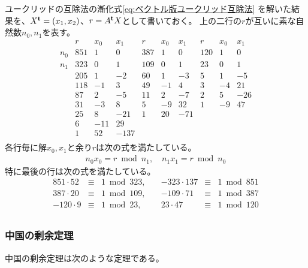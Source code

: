	\begin{example}[ユークリッド互除法の計算]
	\label{eg:ユークリッド互除法の計算} %
		ユークリッドの互除法の漸化式\eqref{eq:ベクトル版ユークリッド互除法}
		を解いた結果を、$X^{\mathbf{t}}=(x_1,x_2)$、$r=A^{\mathbf{t}} X$として書いておく。
		上の二行の$r$が互いに素な自然数$n_0,n_1$を表す。
		\begin{equation*}\begin{array}{r|rrr|rrr|rrr}
			 & r & x_0 & x_1 & r & x_0 & x_1 & r & x_0 & x_1 \\\hline
			n_0 & 851 & 1 & 0 & 387 & 1 & 0 & 120 & 1 & 0 \\
			n_1 & 323 & 0 & 1 & 109 & 0 & 1 & 23 & 0 & 1 \\
			 & 205 & 1 & -2 & 60 & 1 & -3 & 5 & 1 & -5 \\
			 & 118 & -1 & 3 & 49 & -1 & 4 & 3 & -4 & 21 \\
			 & 87 & 2 & -5 & 11 & 2 & -7 & 2 & 5 & -26 \\
			 & 31 & -3 & 8 & 5 & -9 & 32 & 1 & -9 & 47 \\
			 & 25 & 8 & -21 & 1 & 20 & -71 \\
			 & 6 & -11 & 29 \\
			 & 1 & 52 & -137 \\
		\end{array}\end{equation*}
		各行毎に解$x_0,x_1$と余り$r$は次の式を満たしている。
		\begin{equation*}\begin{split}
			n_0x_0 = r\bmod n_1,\quad
			n_1x_1 = r\bmod n_0
		\end{split}\end{equation*}
		特に最後の行は次の式を満たしている。
		{\begin{equation*}\begin{array}{rclrcl}
			851 \cdot 52 &\equiv& 1 \bmod 323 ,\quad &
				- 323 \cdot 137 &\equiv& 1 \bmod 851 \\
			387 \cdot 20 &\equiv& 1 \bmod 109 ,\quad &
				- 109 \cdot 71 &\equiv& 1 \bmod 387 \\
			- 120 \cdot 9 &\equiv& 1 \bmod 23 ,\quad &
				23 \cdot 47 &\equiv& 1 \bmod 120 \\
		\end{array}\end{equation*}}
	\end{example} %
\subsubsection{中国の剰余定理}\label{s3:中国の剰余定理} %
	中国の剰余定理は次のような定理である。

